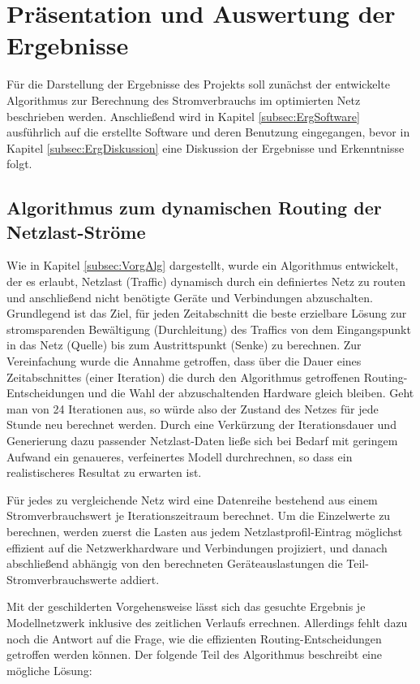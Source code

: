 
\section{Präsentation und Auswertung der Ergebnisse} \label{sec:Erg}
Für die Darstellung der Ergebnisse des Projekts soll zunächst der entwickelte Algorithmus zur Berechnung des Stromverbrauchs im optimierten Netz beschrieben werden. Anschließend wird in Kapitel \ref{subsec:ErgSoftware} ausführlich auf die erstellte Software  und deren Benutzung eingegangen, bevor in Kapitel \ref{subsec:ErgDiskussion} eine Diskussion der Ergebnisse und Erkenntnisse folgt.

\subsection{Algorithmus zum dynamischen Routing der Netzlast-Ströme} \label{subsec:ErgAlg}
Wie in Kapitel \ref{subsec:VorgAlg} dargestellt, wurde ein Algorithmus entwickelt, der es erlaubt, Netzlast (Traffic) dynamisch durch ein definiertes Netz zu routen und anschließend nicht benötigte Geräte und Verbindungen abzuschalten.
Grundlegend ist das Ziel, für jeden Zeitabschnitt die beste erzielbare Lösung zur stromsparenden Bewältigung (Durchleitung) des Traffics von dem Eingangspunkt in das Netz (Quelle) bis zum Austrittspunkt (Senke) zu berechnen. Zur Vereinfachung wurde die Annahme getroffen, dass über die Dauer eines Zeitabschnittes (einer Iteration) die durch den Algorithmus getroffenen Routing-Entscheidungen und die Wahl der abzuschaltenden Hardware gleich bleiben. Geht man von 24 Iterationen aus, so würde also der Zustand des Netzes für jede Stunde neu berechnet werden. Durch eine Verkürzung der Iterationsdauer und Generierung dazu passender Netzlast-Daten ließe sich bei Bedarf mit geringem Aufwand ein genaueres, verfeinertes Modell durchrechnen, so dass ein realistischeres Resultat zu erwarten ist.

Für jedes zu vergleichende Netz wird eine Datenreihe bestehend aus einem Stromverbrauchswert je Iterationszeitraum berechnet. Um die Einzelwerte zu berechnen, werden zuerst die Lasten aus jedem Netzlastprofil-Eintrag möglichst effizient auf die Netzwerkhardware und Verbindungen projiziert, und danach abschließend abhängig von den berechneten Geräteauslastungen die Teil-Stromverbrauchswerte addiert.

Mit der geschilderten Vorgehensweise lässt sich das gesuchte Ergebnis je Modellnetzwerk inklusive des zeitlichen Verlaufs errechnen. Allerdings fehlt dazu noch die Antwort auf die Frage, wie die effizienten Routing-Entscheidungen getroffen werden können. Der folgende Teil des Algorithmus beschreibt eine mögliche Lösung:

